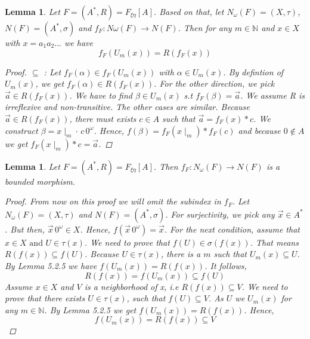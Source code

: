 \documentclass[12pt, a4paper]{scrartcl}
\newtheorem{lemma}[definition]{Lemma}
\begin{document}
\begin{lemma}
    Let $F = (A^*, R) = F_{\xi \eta}[A]$. Based on that, let $N_\omega(F) = (X,\tau)$, $N(F) = (A^*, \sigma)$ and $f_F : N\omega(F) \rightarrow N(F)$.
    Then for any $m \in \mathbb{N}$ and $x\in X$ with $x = a_1a_2...$ \newline we have $$f_F(U_m(x)) = R(f_F(x))$$
    \vspace{0.01cm}
    \begin{proof}
            $\subseteq$ : Let $f_F(\alpha) \in f_F(U_m(x))$ with $\alpha \in U_m(x)$. By defintion of $U_m(x)$,
            we get $f_F(\alpha) \in R(f_F(x))$. \newline \newline
            For the other direction, we pick $\vec{a} \in R(f_F(x))$. We have to find $\beta \in U_m(x)$ s.t $f_F(\beta) = \vec{a}$. We assume R is irreflexive and non-transitive.
            The other cases are similar. \newline
            Because $\vec{a} \in R(f_F(x))$, there must exists $c \in A$ such that $ \vec{a} = f_F(x) * c $.
            We construct $\beta = x \mid_m \cdot \, c\, 0^\omega$. Hence, $f(\beta) = f_F(x \mid_m) * f_F(c)$ and because $ 0 \notin A$ we get $f_F(x \mid_m) * c = \vec{a}$.
            
            
    \end{proof}
\end{lemma}

\begin{lemma}
    Let $F =(A^*,R) = F_{\xi \eta}[A]$. Then $f_F : N_\omega(F) \rightarrow N(F)$ is a bounded morphism.

    \begin{proof}
        From now on this proof we will omit the subindex in $f_F$.
        Let $N_\omega(F) = (X, \tau)$ and $N(F) =(A^*, \sigma)$. \newline For surjectivity, we pick any $\vec{x} \in A^*$. But then, $\vec{x}\,0^\omega \in X$. Hence, $f(\vec{x}\, 0^\omega) = \vec{x}$. \newline 
        For the next condition, assume that $x \in X \mbox{ and } U \in \tau(x)$. We need to prove that $f(U) \in \sigma(f(x))$. That means $R(f(x)) \subseteq f(U)$. Because $U \in \tau(x)$, there is a $m$ such that
        $U_m(x) \subseteq U$. By Lemma 5.2.5 we have $f(U_m(x)) = R(f(x))$. It follows, 
        $$R(f(x)) = f(U_m(x)) \subseteq f(U)$$ 
        \newline
        Assume $x\in X$ and $V$ is a neighborhood of x, i.e $R(f(x)) \subseteq V$. We need to prove that there exists $U \in \tau(x)$, such that $f(U)\subseteq V$.
        As $U$ we $U_m(x)$ for any $m \in \mathbb{N}$. By Lemma 5.2.5 we get $f(U_m(x)) = R(f(x))$. Hence, 
        $$f(U_m(x)) = R(f(x)) \subseteq V$$

    \end{proof} 
\end{lemma}
\end{document}
